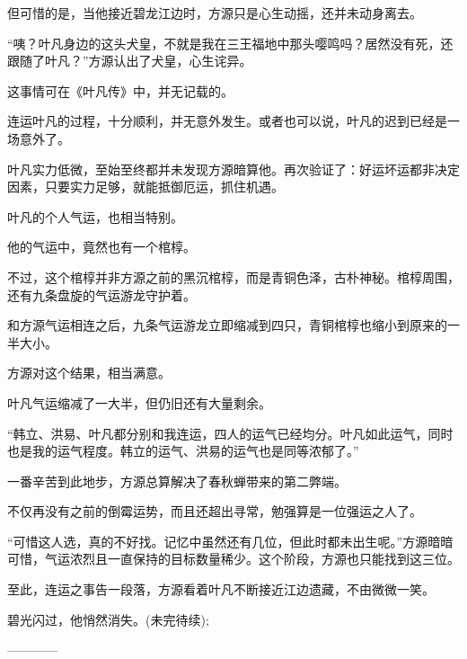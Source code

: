 \begin{this_body}
但可惜的是，当他接近碧龙江边时，方源只是心生动摇，还并未动身离去。

“咦？叶凡身边的这头犬皇，不就是我在三王福地中那头嘤鸣吗？居然没有死，还跟随了叶凡？”方源认出了犬皇，心生诧异。

这事情可在《叶凡传》中，并无记载的。

连运叶凡的过程，十分顺利，并无意外发生。或者也可以说，叶凡的迟到已经是一场意外了。

叶凡实力低微，至始至终都并未发现方源暗算他。再次验证了：好运坏运都非决定因素，只要实力足够，就能抵御厄运，抓住机遇。

叶凡的个人气运，也相当特别。

他的气运中，竟然也有一个棺椁。

不过，这个棺椁并非方源之前的黑沉棺椁，而是青铜色泽，古朴神秘。棺椁周围，还有九条盘旋的气运游龙守护着。

和方源气运相连之后，九条气运游龙立即缩减到四只，青铜棺椁也缩小到原来的一半大小。

方源对这个结果，相当满意。

叶凡气运缩减了一大半，但仍旧还有大量剩余。

“韩立、洪易、叶凡都分别和我连运，四人的运气已经均分。叶凡如此运气，同时也是我的运气程度。韩立的运气、洪易的运气也是同等浓郁了。”

一番辛苦到此地步，方源总算解决了春秋蝉带来的第二弊端。

不仅再没有之前的倒霉运势，而且还超出寻常，勉强算是一位强运之人了。

“可惜这人选，真的不好找。记忆中虽然还有几位，但此时都未出生呢。”方源暗暗可惜，气运浓烈且一直保持的目标数量稀少。这个阶段，方源也只能找到这三位。

至此，连运之事告一段落，方源看着叶凡不断接近江边遗藏，不由微微一笑。

碧光闪过，他悄然消失。(未完待续);

------------

\end{this_body}

